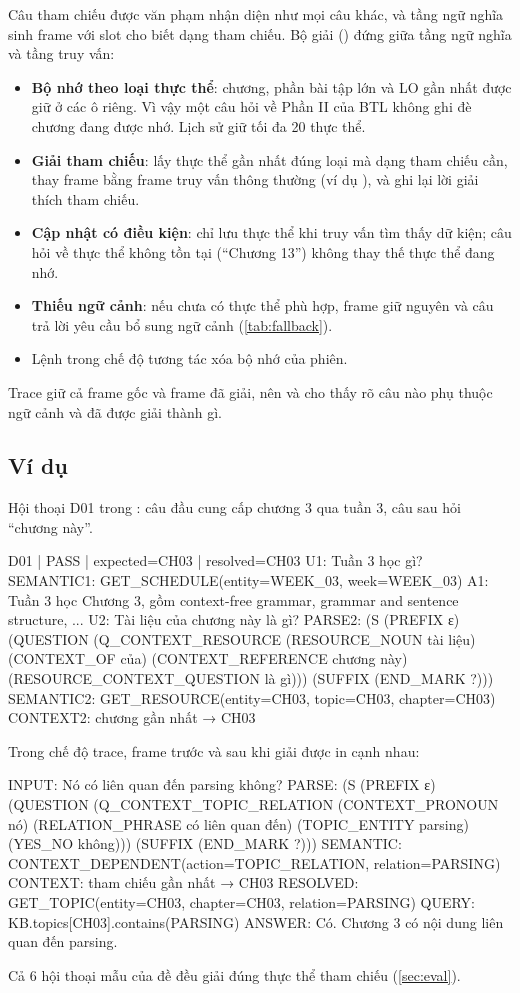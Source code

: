Câu tham chiếu được văn phạm nhận diện như mọi câu khác, và tầng ngữ nghĩa sinh frame
 với slot  cho biết dạng tham chiếu. Bộ giải
() đứng giữa tầng ngữ nghĩa và tầng truy vấn:
\begin{itemize}
  \item \textbf{Bộ nhớ theo loại thực thể}: chương, phần bài tập lớn và LO gần nhất được
        giữ ở các ô riêng. Vì vậy một câu hỏi về Phần II của BTL không ghi đè chương đang
        được nhớ. Lịch sử giữ tối đa 20 thực thể.
  \item \textbf{Giải tham chiếu}:  lấy thực thể gần nhất đúng loại mà
        dạng tham chiếu cần, thay frame  bằng frame truy vấn
        thông thường (ví dụ ), và ghi lại lời giải thích tham chiếu.
  \item \textbf{Cập nhật có điều kiện}:  chỉ lưu thực thể khi truy vấn
        tìm thấy dữ kiện; câu hỏi về thực thể không tồn tại (``Chương 13'') không thay
        thế thực thể đang nhớ.
  \item \textbf{Thiếu ngữ cảnh}: nếu chưa có thực thể phù hợp, frame giữ nguyên và câu
        trả lời yêu cầu bổ sung ngữ cảnh (\cref{tab:fallback}).
  \item Lệnh  trong chế độ tương tác xóa bộ nhớ của phiên.
\end{itemize}
Trace giữ cả frame gốc và frame đã giải, nên  và
 cho thấy rõ câu nào phụ thuộc ngữ cảnh và đã được giải thành gì.

\subsection{Ví dụ}

Hội thoại D01 trong : câu đầu cung cấp chương 3 qua tuần 3, câu sau
hỏi ``chương này''.
\begin{trace}
D01 | PASS | expected=CH03 | resolved=CH03
U1: Tuần 3 học gì?
SEMANTIC1: GET_SCHEDULE(entity=WEEK_03, week=WEEK_03)
A1: Tuần 3 học Chương 3, gồm context-free grammar, grammar and sentence structure, ...
U2: Tài liệu của chương này là gì?
PARSE2: (S (PREFIX ε) (QUESTION (Q_CONTEXT_RESOURCE (RESOURCE_NOUN tài liệu) (CONTEXT_OF của) (CONTEXT_REFERENCE chương này) (RESOURCE_CONTEXT_QUESTION là gì))) (SUFFIX (END_MARK ?)))
SEMANTIC2: GET_RESOURCE(entity=CH03, topic=CH03, chapter=CH03)
CONTEXT2: chương gần nhất → CH03
\end{trace}

Trong chế độ trace, frame trước và sau khi giải được in cạnh nhau:
\begin{trace}
INPUT: Nó có liên quan đến parsing không?
PARSE: (S (PREFIX ε) (QUESTION (Q_CONTEXT_TOPIC_RELATION (CONTEXT_PRONOUN nó) (RELATION_PHRASE có liên quan đến) (TOPIC_ENTITY parsing) (YES_NO không))) (SUFFIX (END_MARK ?)))
SEMANTIC: CONTEXT_DEPENDENT(action=TOPIC_RELATION, relation=PARSING)
CONTEXT: tham chiếu gần nhất → CH03
RESOLVED: GET_TOPIC(entity=CH03, chapter=CH03, relation=PARSING)
QUERY: KB.topics[CH03].contains(PARSING)
ANSWER: Có. Chương 3 có nội dung liên quan đến parsing.
\end{trace}
Cả 6 hội thoại mẫu của đề đều giải đúng thực thể tham chiếu (\cref{sec:eval}).

